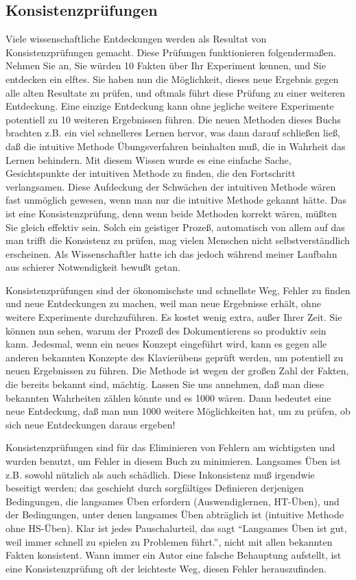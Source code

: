 \subsection{Konsistenzprüfungen}
\label{c3_3e}

Viele wissenschaftliche Entdeckungen werden als Resultat von Konsistenzprüfungen gemacht.
Diese Prüfungen funktionieren folgendermaßen.
Nehmen Sie an, Sie würden 10 Fakten über Ihr Experiment kennen, und Sie entdecken ein elftes.
Sie haben nun die Möglichkeit, dieses neue Ergebnis gegen alle alten Resultate zu prüfen, und oftmals führt diese Prüfung zu einer weiteren Entdeckung.
Eine einzige Entdeckung kann ohne jegliche weitere Experimente potentiell zu 10 weiteren Ergebnissen führen.
Die neuen Methoden dieses Buchs brachten z.B. ein viel schnelleres Lernen hervor, was dann darauf schließen ließ, daß die intuitive Methode Übungsverfahren beinhalten muß, die in Wahrheit das Lernen behindern.
Mit diesem Wissen wurde es eine einfache Sache, Gesichtspunkte der intuitiven Methode zu finden, die den Fortschritt verlangsamen.
Diese Aufdeckung der Schwächen der intuitiven Methode wären fast unmöglich gewesen, wenn man nur die intuitive Methode gekannt hätte.
Das ist eine Konsistenzprüfung, denn wenn beide Methoden korrekt wären, müßten Sie gleich effektiv sein.
Solch ein geistiger Prozeß, automatisch von allem auf das man trifft die Konsistenz zu prüfen, mag vielen Menschen nicht selbstverständlich erscheinen.
Als Wissenschaftler hatte ich das jedoch während meiner Laufbahn aus schierer Notwendigkeit bewußt getan.

Konsistenzprüfungen sind der ökonomischste und schnellste Weg, Fehler zu finden und neue Entdeckungen zu machen, weil man neue Ergebnisse erhält, ohne weitere Experimente durchzuführen.
Es kostet wenig extra, außer Ihrer Zeit.
Sie können nun sehen, warum der Prozeß des Dokumentierens so produktiv sein kann.
Jedesmal, wenn ein neues Konzept eingeführt wird, kann es gegen alle anderen bekannten Konzepte des Klavierübens geprüft werden, um potentiell zu neuen Ergebnissen zu führen.
Die Methode ist wegen der großen Zahl der Fakten, die bereits bekannt sind, mächtig.
Lassen Sie uns annehmen, daß man diese bekannten Wahrheiten zählen könnte und es 1000 wären.
Dann bedeutet eine neue Entdeckung, daß man nun 1000 weitere Möglichkeiten hat, um zu prüfen, ob sich neue Entdeckungen daraus ergeben!

Konsistenzprüfungen sind für das Eliminieren von Fehlern am wichtigsten und wurden benutzt, um Fehler in diesem Buch zu minimieren.
Langsames Üben ist z.B. sowohl nützlich als auch schädlich.
Diese Inkonsistenz muß irgendwie beseitigt werden; das geschieht durch sorgfältiges Definieren derjenigen Bedingungen, die langsames Üben erfordern (Auswendiglernen, HT-Üben), und der Bedingungen, unter denen langsames Üben abträglich ist (intuitive Methode ohne HS-Üben).
Klar ist jedes Pauschalurteil, das sagt \enquote{Langsames Üben ist gut, weil immer schnell zu spielen zu Problemen führt.}, nicht mit allen bekannten Fakten konsistent.
Wann immer ein Autor eine falsche Behauptung aufstellt, ist eine Konsistenzprüfung oft der leichteste Weg, diesen Fehler herauszufinden.


